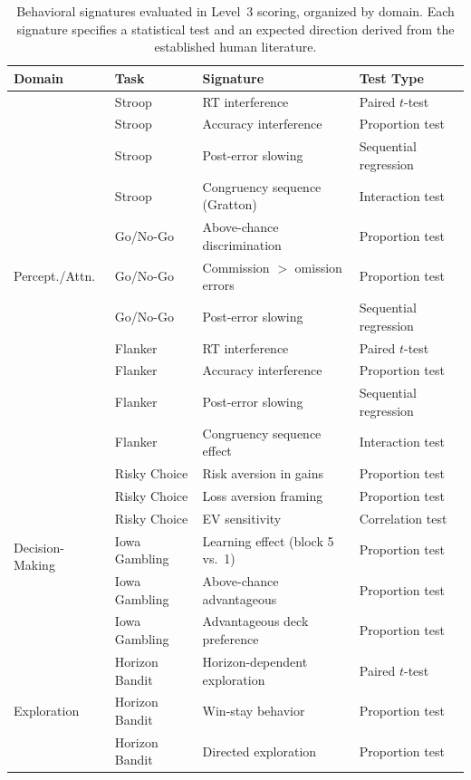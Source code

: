 \documentclass{article}
\begin{document}
\begin{table}[t]
\caption{Behavioral signatures evaluated in Level~3 scoring, organized by domain. Each signature specifies a statistical test and an expected direction derived from the established human literature.}
\label{tab:signatures}
\centering
\small
\begin{tabular}{@{}llll@{}}
\toprule
\textbf{Domain} & \textbf{Task} & \textbf{Signature} & \textbf{Test Type} \\
\midrule
\multirow{11}{*}{Percept./Attn.} & Stroop & RT interference & Paired $t$-test \\
 & Stroop & Accuracy interference & Proportion test \\
 & Stroop & Post-error slowing & Sequential regression \\
 & Stroop & Congruency sequence (Gratton) & Interaction test \\
 & Go/No-Go & Above-chance discrimination & Proportion test \\
 & Go/No-Go & Commission $>$ omission errors & Proportion test \\
 & Go/No-Go & Post-error slowing & Sequential regression \\
 & Flanker & RT interference & Paired $t$-test \\
 & Flanker & Accuracy interference & Proportion test \\
 & Flanker & Post-error slowing & Sequential regression \\
 & Flanker & Congruency sequence effect & Interaction test \\
\midrule
\multirow{6}{*}{Decision-Making} & Risky Choice & Risk aversion in gains & Proportion test \\
 & Risky Choice & Loss aversion framing & Proportion test \\
 & Risky Choice & EV sensitivity & Correlation test \\
 & Iowa Gambling & Learning effect (block 5 vs.\ 1) & Proportion test \\
 & Iowa Gambling & Above-chance advantageous & Proportion test \\
 & Iowa Gambling & Advantageous deck preference & Proportion test \\
\midrule
\multirow{3}{*}{Exploration} & Horizon Bandit & Horizon-dependent exploration & Paired $t$-test \\
 & Horizon Bandit & Win-stay behavior & Proportion test \\
 & Horizon Bandit & Directed exploration & Proportion test \\

\end{tabular}
\end{table}
\end{document}

